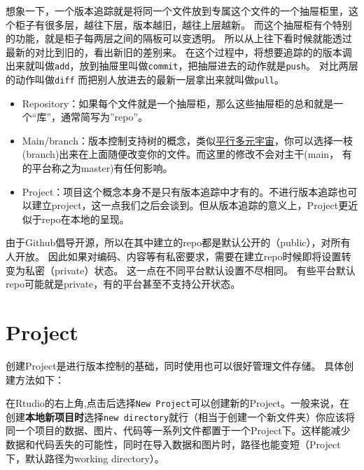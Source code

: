 \documentclass[
  letterpaper,
  DIV=11,
  numbers=noendperiod,
  oneside]{scrreprt}
\providecommand{\tightlist}{%
  \setlength{\itemsep}{0pt}\setlength{\parskip}{0pt}}\usepackage{longtable,booktabs,array}
\begin{document}
想象一下，一个版本追踪就是将同一个文件放到专属这个文件的一个抽屉柜里，这个柜子有很多层，越往下层，版本越旧，越往上层越新。
而这个抽屉柜有个特别的功能，就是柜子每两层之间的隔板可以变透明。
所以从上往下看时候就能透过最新的对比到旧的，看出新旧的差别来。
在这个过程中，将想要追踪的的版本调出来就叫做\texttt{add}，放到抽屉里叫做\texttt{commit}，把抽屉进去的动作就是\texttt{push}。
对比两层的动作叫做\texttt{diff}
而把别人放进去的最新一层拿出来就叫做\texttt{pull}。

\begin{itemize}
\tightlist
\item
  Repository：如果每个文件就是一个抽屉柜，那么这些抽屉柜的总和就是一个``库''，通常简写为''repo''。
\item
  Main/branch：版本控制支持树的概念，类似\href{https://en.wikipedia.org/wiki/Multiverse}{平行多元宇宙}，你可以选择一枝(branch)出来在上面随便改变你的文件。而这里的修改不会对主干(main，
  有的平台称之为master)有任何影响。
\item
  Project：项目这个概念本身不是只有版本追踪中才有的。不进行版本追踪也可以建立project，这一点我们之后会谈到。但从版本追踪的意义上，Project更近似于repo在本地的呈现。
\end{itemize}

\begin{tcolorbox}[enhanced jigsaw, arc=.35mm, breakable, coltitle=black, colframe=quarto-callout-caution-color-frame, toptitle=1mm, colbacktitle=quarto-callout-caution-color!10!white, leftrule=.75mm, left=2mm, bottomtitle=1mm, rightrule=.15mm, title=\textcolor{quarto-callout-caution-color}{\faFire}\hspace{0.5em}{Danger}, opacityback=0, bottomrule=.15mm, titlerule=0mm, opacitybacktitle=0.6, colback=white, toprule=.15mm]
由于Github倡导开源，所以在其中建立的repo都是默认公开的（public），对所有人开放。
因此如果对编码、内容等有私密要求，需要在建立repo时候即将设置转变为私密（private）状态。
这一点在不同平台默认设置不尽相同。
有些平台默认repo可能就是private，有的平台甚至不支持公开状态。
\end{tcolorbox}

\hypertarget{project}{%
\section{Project}\label{project}}

创建Project是进行版本控制的基础，同时使用也可以很好管理文件存储。
具体创建方法如下：

在Rtudio的右上角,点击后选择\texttt{New\ Project}可以创建新的Project。一般来说，在创建\textbf{本地新项目时}选择\texttt{new\ directory}就行（相当于创建一个新文件夹）你应该将同一个项目的数据、图片、代码等一系列文件都置于一个Project下。这样能减少数据和代码丢失的可能性，同时在导入数据和图片时，路径也能变短（Project下，默认路径为working
directory）。
\end{document}
